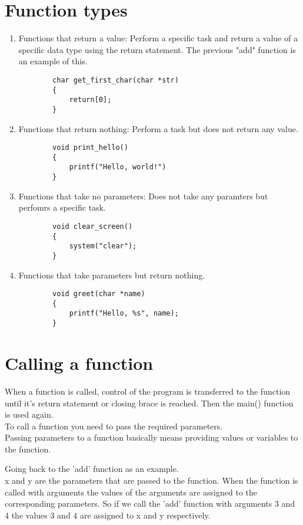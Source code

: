 \documentclass[
	12pt, %
]{fphw}
\begin{document}
\section*{Function types}

\begin{enumerate}
	\item Functions that return a value:
		Perform a specific task and return a value of a specific data type using 
		the return statement. The previous "add" function is an example of this.
	\begin{lstlisting}
		char get_first_char(char *str)
		{
			return[0];
		}
	\end{lstlisting}
	\item Functions that return nothing:
	Perform a task but does not return any value.
	\begin{lstlisting}
		void print_hello()
		{
			printf("Hello, world!")
		}
	\end{lstlisting}
	\item Functions that take no parameters:
		Does not take any paramters but perfomrs a specific task.
	\begin{lstlisting}
		void clear_screen()
		{
			system("clear");
		}
	\end{lstlisting}
	\item Functions that take parameters but return nothing.
	\begin{lstlisting}
		void greet(char *name)
		{
			printf("Hello, %s", name);
		}
	\end{lstlisting}
\end{enumerate}

\section*{Calling a function}
When a function is called, control of the program is transferred to the function
until it's return statement or closing brace is reached. Then the main() 
function is used again.\\

To call a function you need to pass the required parameters.\\

Passing parameters to a function basically means providing values or variables
to the function.

Going back to the 'add' function as an example. \\
x and y are the parameters that are passed to the function. When the function is
called with arguments the values of the arguments are assigned to the corresponding
parameters. So if we call the 'add' function with arguments 3 and 4 the values
3 and 4 are assigned to x and y respectively.\\
\end{document}
